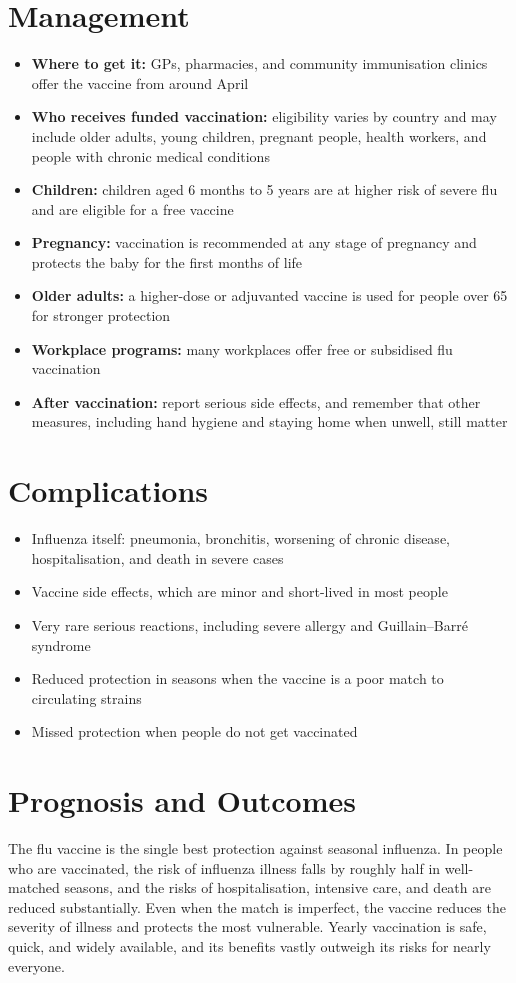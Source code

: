 \section*{Management}
\begin{itemize}
    \item \textbf{Where to get it:} GPs, pharmacies, and community immunisation clinics offer the vaccine from around April
    \item \textbf{Who receives funded vaccination:} eligibility varies by country and may include older adults, young children, pregnant people, health workers, and people with chronic medical conditions
    \item \textbf{Children:} children aged 6 months to 5 years are at higher risk of severe flu and are eligible for a free vaccine
    \item \textbf{Pregnancy:} vaccination is recommended at any stage of pregnancy and protects the baby for the first months of life
    \item \textbf{Older adults:} a higher-dose or adjuvanted vaccine is used for people over 65 for stronger protection
    \item \textbf{Workplace programs:} many workplaces offer free or subsidised flu vaccination
    \item \textbf{After vaccination:} report serious side effects, and remember that other measures, including hand hygiene and staying home when unwell, still matter
\end{itemize}

\section*{Complications}
\begin{itemize}
    \item Influenza itself: pneumonia, bronchitis, worsening of chronic disease, hospitalisation, and death in severe cases
    \item Vaccine side effects, which are minor and short-lived in most people
    \item Very rare serious reactions, including severe allergy and Guillain--Barré syndrome
    \item Reduced protection in seasons when the vaccine is a poor match to circulating strains
    \item Missed protection when people do not get vaccinated
\end{itemize}

\section*{Prognosis and Outcomes}
The flu vaccine is the single best protection against seasonal influenza. In people who are vaccinated, the risk of influenza illness falls by roughly half in well-matched seasons, and the risks of hospitalisation, intensive care, and death are reduced substantially. Even when the match is imperfect, the vaccine reduces the severity of illness and protects the most vulnerable. Yearly vaccination is safe, quick, and widely available, and its benefits vastly outweigh its risks for nearly everyone.

